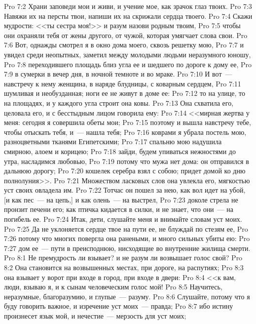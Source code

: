 \vs Pro 7:2 Храни заповеди мои и живи, и учение мое, как зрачок глаз твоих.
\vs Pro 7:3 Навяжи их на персты твои, напиши их на скрижали сердца твоего.
\vs Pro 7:4 Скажи мудрости: <<ты сестра моя!>> и разум назови родным твоим,
\vs Pro 7:5 чтобы они охраняли тебя от жены другого, от чужой, которая умягчает слова свои.
\vs Pro 7:6 Вот, однажды смотрел я в окно дома моего, сквозь решетку мою,
\vs Pro 7:7 и увидел среди неопытных, заметил между молодыми людьми неразумного юношу,
\vs Pro 7:8 переходившего площадь близ угла ее и шедшего по дороге к дому ее,
\vs Pro 7:9 в сумерки в вечер дня, в ночной темноте и во мраке.
\vs Pro 7:10 И вот~--- навстречу к нему женщина, в наряде блудницы, с коварным сердцем,
\vs Pro 7:11 шумливая и необузданная; ноги ее не живут в доме ее:
\vs Pro 7:12 то на улице, то на площадях, и у каждого угла строит она ковы.
\vs Pro 7:13 Она схватила его, целовала его, и с бесстыдным лицом говорила ему:
\vs Pro 7:14 <<мирная жертва у меня: сегодня я совершила обеты мои;
\vs Pro 7:15 поэтому и вышла навстречу тебе, чтобы отыскать тебя, и~--- нашла тебя;
\vs Pro 7:16 коврами я убрала постель мою, разноцветными тканями Египетскими;
\vs Pro 7:17 спальню мою надушила смирною, алоем и корицею;
\vs Pro 7:18 зайди, будем упиваться нежностями до утра, насладимся любовью,
\vs Pro 7:19 потому что мужа нет дома: он отправился в дальнюю дорогу;
\vs Pro 7:20 кошелек серебра взял с собою; придет домой ко дню полнолуния>>.
\vs Pro 7:21 Множеством ласковых слов она увлекла его, мягкостью уст своих овладела им.
\vs Pro 7:22 Тотчас он пошел за нею, как вол идет на убой, [и как пес~--- на цепь,] и как олень~--- на выстрел,
\vs Pro 7:23 доколе стрела не пронзит печени его; как птичка кидается в силки, и не знает, что они~--- на погибель ее.
\vs Pro 7:24 Итак, дети, слушайте меня и внимайте словам уст моих.
\vs Pro 7:25 Да не уклоняется сердце твое на пути ее, не блуждай по стезям ее,
\vs Pro 7:26 потому что многих повергла она ранеными, и много сильных убиты ею:
\vs Pro 7:27 дом ее~--- пути в преисподнюю, нисходящие во внутренние жилища смерти.
\vs Pro 8:1 Не премудрость ли взывает? и не разум ли возвышает голос свой?
\vs Pro 8:2 Она становится на возвышенных местах, при дороге, на распутиях;
\vs Pro 8:3 она взывает у ворот при входе в город, при входе в двери:
\vs Pro 8:4 <<к вам, люди, взываю я, и к сынам человеческим голос мой!
\vs Pro 8:5 Научитесь, неразумные, благоразумию, и глупые~--- разуму.
\vs Pro 8:6 Слушайте, потому что я буду говорить важное, и изречение уст моих~--- правда;
\vs Pro 8:7 ибо истину произнесет язык мой, и нечестие~--- мерзость для уст моих;
